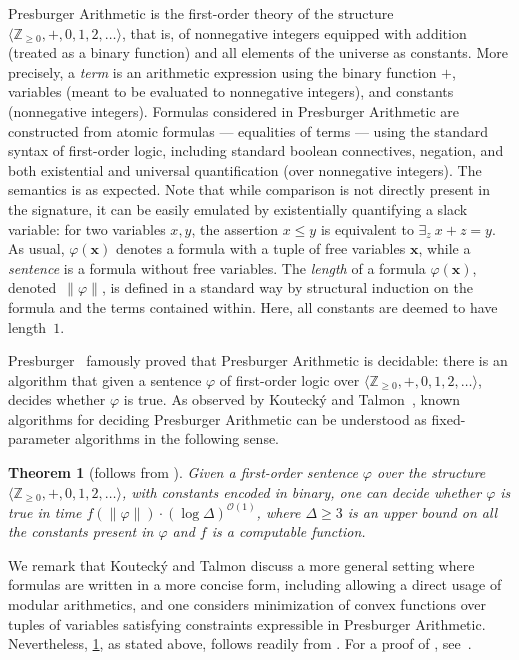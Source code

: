 \documentclass{article}
\newtheorem{theorem}{Theorem}\newtheorem{lemma}[theorem]{Lemma}\newtheorem{proposition}[theorem]{Proposition}\newtheorem{corollary}[theorem]{Corollary}\newtheorem{definition}[theorem]{Definition}\newtheorem{claim}[theorem]{Claim}\newtheorem{remark}[theorem]{Remark}\newtheorem{observation}[theorem]{Observation}\newtheorem{conjecture}[theorem]{Conjecture}\newtheorem{example}[theorem]{Example}
\renewcommand{\leq}{\leqslant}
\renewcommand{\geq}{\geqslant}
\newcommand{\Z}{\mathbb{Z}}
\newcommand{\Zn}{\Z_{\geq 0}}
\newcommand{\tup}[1]{{\mathbf{#1}}}
\newcommand{\xx}{\tup x}
\newcommand{\Oh}{{\mathcal{O}}}
\begin{document}
Presburger Arithmetic is the first-order theory of the structure $\langle \Zn,+,0,1,2,\ldots \rangle$, that is, of nonnegative integers equipped with addition (treated as a binary function) and all elements of the universe as constants. More precisely, a {\em{term}} is an arithmetic expression using the binary function $+$, variables (meant to be evaluated to nonnegative integers), and constants (nonnegative integers). Formulas considered in Presburger Arithmetic are constructed from atomic formulas --- equalities of terms --- using the standard syntax of first-order logic, including standard boolean connectives, negation, and both existential and universal quantification (over nonnegative integers). The semantics is as expected. Note that while comparison is not directly present in the signature, it can be easily emulated by existentially quantifying a slack variable: for two variables $x,y$, the assertion $x\leq y$ is equivalent to $\exists_z\ x+z=y$. As usual, $\varphi(\xx)$ denotes a formula with a tuple of free variables $\xx$, while a {\em{sentence}} is a formula without free variables. The {\em{length}} of a formula $\varphi(\xx)$, denoted~$\|\varphi\|$, is defined in a standard way by structural induction on the formula and the terms contained within. Here, all constants are deemed to have length~$1$.

Presburger~\cite{Presburger29} famously proved that Presburger Arithmetic is decidable: there is an algorithm that given a sentence $\varphi$ of first-order logic over $\langle \Zn,+,0,1,2,\ldots \rangle$, decides whether $\varphi$ is true. As observed by Kouteck\'y and Talmon~\cite{KouteckyT21}, known algorithms for deciding Presburger Arithmetic can be understood as fixed-parameter algorithms in the following sense.

\begin{theorem}[follows from {\cite[Theorem~1]{KouteckyT21}}]\label{thm:PA}
Given a first-order sentence $\varphi$ over the structure $\langle \Zn,+,0,1,2,\ldots \rangle$, with constants encoded in binary, one can decide whether $\varphi$ is true in time $f(\|\varphi\|)\cdot (\log \Delta)^{\Oh(1)}$, where $\Delta\geq 3$ is an upper bound on all the constants present in $\varphi$ and $f$ is a computable function.
\end{theorem}

We remark that Kouteck\'y and Talmon discuss a more general setting where formulas are written in a more concise form, including allowing a direct usage of modular arithmetics, and one considers minimization of convex functions over tuples of variables satisfying constraints expressible in Presburger Arithmetic. Nevertheless, \cref{thm:PA}, as stated above, follows readily from \cite[Theorem~1]{KouteckyT21}. For a proof of \cite[Theorem~1]{KouteckyT21}, see~\cite[Theorem~2.2]{KouteckyT20}.
\end{document}
